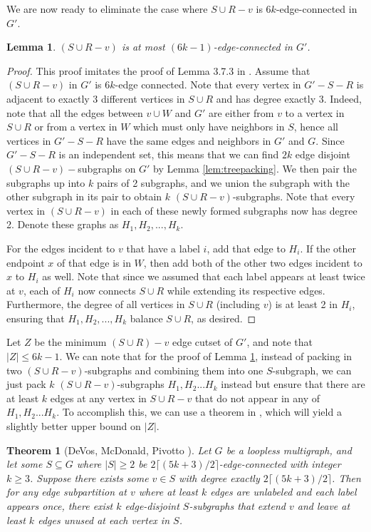\documentclass{article}
\newtheorem{lemma}{Lemma}[section]
\newtheorem{theorem}{Theorem}[section]
\begin{document}
We are now ready to eliminate the case where $S \cup R-v$ is $6k$-edge-connected in $G'$.
\begin{lemma}\label{lem:6kconn} 
    $(S \cup R-v)$ is at most $(6k-1)$-edge-connected in $G'$. 
\end{lemma}
\begin{proof}
    This proof imitates the proof of Lemma 3.7.3 in \cite{lau-thesis}. Assume that $(S \cup R-v)$ in $G'$ is $6k$-edge connected. Note that every vertex in $G'-S-R$ is adjacent to exactly 3 different vertices in $S \cup R$ and has degree exactly 3. Indeed, note that all the edges between $v \cup W$ and $G'$ are either from $v$ to a vertex in $S \cup R$ or from a vertex in $W$ which must only have neighbors in $S$, hence all vertices in $G'-S-R$ have the same edges and neighbors in $G'$ and $G$. Since $G'-S-R$ is an independent set, this means that we can find $2k$ edge disjoint $(S \cup R-v)-$subgraphs on $G'$ by Lemma \ref{lem:treepacking}. We then pair the subgraphs up into $k$ pairs of 2 subgraphs, and we union the subgraph with the other subgraph in its pair to obtain $k$ $(S \cup R-v)$-subgraphs. Note that every vertex in $(S \cup R-v)$ in each of these newly formed subgraphs now has degree 2. Denote these graphs as $H_1, H_2,...,H_k$.

    For the edges incident to $v$ that have a label $i$, add that edge to $H_i$. If the other endpoint $x$ of that edge is in $W$, then add both of the other two edges incident to $x$ to $H_i$ as well. Note that since we assumed that each label appears at least twice at $v$, each of $H_i$ now connects $S \cup R$ while extending its respective edges. Furthermore, the degree of all vertices in $S \cup R$ (including $v$) is at least 2 in $H_i$, ensuring that $H_1,H_2,...,H_k$ balance $S \cup R$, as desired. 
\end{proof}

Let $Z$ be the minimum $(S \cup R)-v$ edge cutset of $G'$, and note that $|Z| \leq 6k-1$. We can note that for the proof of Lemma \ref{lem:6kconn}, instead of packing in two $(S \cup R-v)$-subgraphs and combining them into one $S$-subgraph, we can just pack $k$ $(S \cup R-v)$-subgraphs $H_1, H_2...H_k$ instead but ensure that there are at least $k$ edges at any vertex in $S \cup R-v$ that do not appear in any of $H_1,H_2...H_k$. To accomplish this, we can use a theorem in \cite{devos2016packing}, which will yield a slightly better upper bound on $|Z|$. 

\begin{theorem}[DeVos, McDonald, Pivotto \cite{devos2016packing}]\label{thm:devosext}
    Let $G$ be a loopless multigraph, and let some $S \subseteq G$ where $|S| \geq 2$ be $2 \lceil (5k+3)/2 \rceil$-edge-connected with integer $k \geq 3$. Suppose there exists some $v \in S$ with degree exactly $2 \lceil (5k+3)/2 \rceil$. Then for any edge subpartition at $v$ where at least $k$ edges are unlabeled and each label appears once, there exist $k$ edge-disjoint $S$-subgraphs that extend $v$ and leave at least $k$ edges unused at each vertex in $S$. 
\end{theorem}
\end{document}
